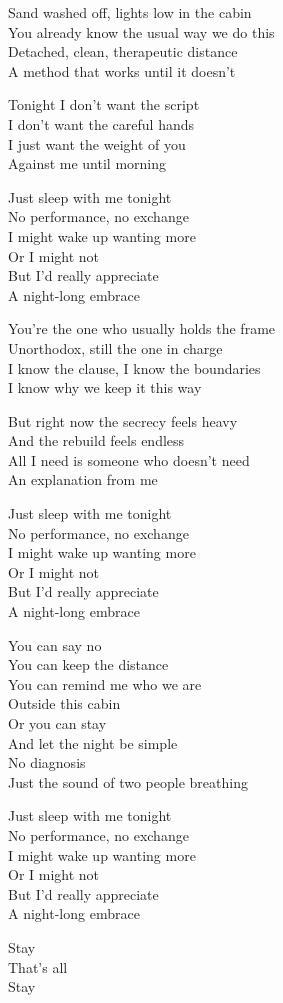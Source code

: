 \begin{lyrics}
Sand washed off, lights low in the cabin\\
You already know the usual way we do this\\
Detached, clean, therapeutic distance\\
A method that works until it doesn’t

Tonight I don’t want the script\\
I don’t want the careful hands\\
I just want the weight of you\\
Against me until morning

Just sleep with me tonight\\
No performance, no exchange\\
I might wake up wanting more\\
Or I might not\\
But I’d really appreciate\\
A night-long embrace

You’re the one who usually holds the frame\\
Unorthodox, still the one in charge\\
I know the clause, I know the boundaries\\
I know why we keep it this way

But right now the secrecy feels heavy\\
And the rebuild feels endless\\
All I need is someone who doesn’t need\\
An explanation from me

Just sleep with me tonight\\
No performance, no exchange\\
I might wake up wanting more\\
Or I might not\\
But I’d really appreciate\\
A night-long embrace

You can say no\\
You can keep the distance\\
You can remind me who we are\\
Outside this cabin\\
Or you can stay\\
And let the night be simple\\
No diagnosis\\
Just the sound of two people breathing

Just sleep with me tonight\\
No performance, no exchange\\
I might wake up wanting more\\
Or I might not\\
But I’d really appreciate\\
A night-long embrace

Stay\\
That’s all\\
Stay
\end{lyrics}


